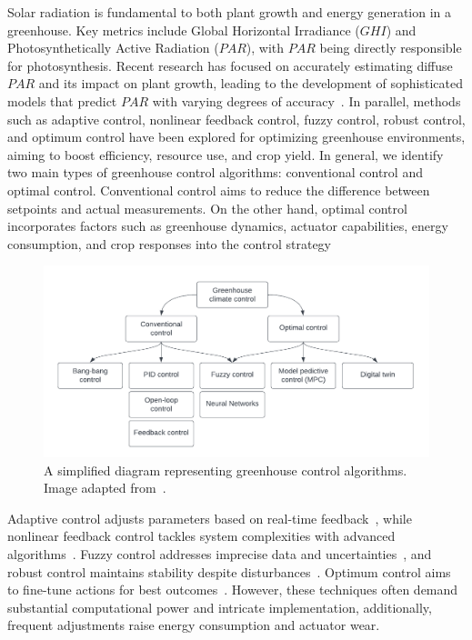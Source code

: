 \documentclass[conference]{IEEEtran}
\begin{document}
Solar radiation is fundamental to both plant growth and energy generation in a greenhouse. Key metrics include Global Horizontal Irradiance (\(GHI\)) and Photosynthetically Active Radiation (\(PAR\)), with \(PAR\) being directly responsible for photosynthesis. Recent research has focused on accurately estimating diffuse \(PAR\) and its impact on plant growth, leading to the development of sophisticated models that predict \(PAR\) with varying degrees of accuracy~\cite{Iddio2020, MaLu2022}. In parallel, methods such as adaptive control, nonlinear feedback control, fuzzy control, robust control, and optimum control have been explored for optimizing greenhouse environments, aiming to boost efficiency, resource use, and crop yield. In general, we identify two main types of greenhouse control algorithms: conventional control and optimal control. Conventional control aims to reduce the difference between setpoints and actual measurements. On the other hand, optimal control incorporates factors such as greenhouse dynamics, actuator capabilities, energy consumption, and crop responses into the control strategy

\begin{figure}
    \centering
    \includegraphics[width=.5\textwidth]{images/flowchart.pdf}
    \caption{A simplified diagram representing greenhouse control algorithms. Image adapted from~\cite{Trepanier2024}.}\label{fig:flowchart}
\end{figure}

Adaptive control adjusts parameters based on real-time feedback~\cite{Tian2022}, while nonlinear feedback control tackles system complexities with advanced algorithms~\cite{Bood2023}. Fuzzy control addresses imprecise data and uncertainties~\cite{smartcities7030055}, and robust control maintains stability despite disturbances~\cite{Zhang2021}. Optimum control aims to fine-tune actions for best outcomes~\cite{Debroy2024, SVENSEN2024108578}. However, these techniques often demand substantial computational power and intricate implementation, additionally, frequent adjustments raise energy consumption and actuator wear.
\end{document}
